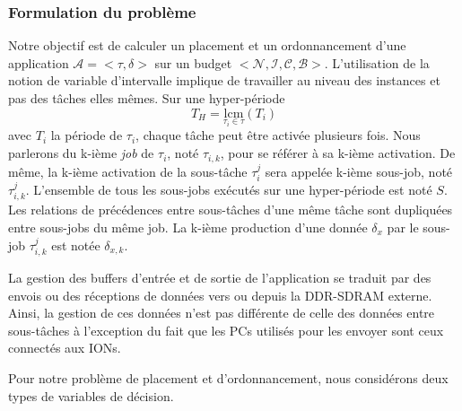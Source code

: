 \documentclass[main.tex]{subfiles}
\begin{document}
\subsubsection{Formulation du problème}
Notre objectif est de calculer un placement et un ordonnancement d'une application $\mathcal{A} = <\tau , \delta>$ sur un budget $<\mathcal{N} , \mathcal{I} , \mathcal{C} , \mathcal{B} >$. L'utilisation de la notion de variable d'intervalle implique de travailler au niveau des instances et pas des tâches elles mêmes. Sur une hyper-période $$T_H = \underset{\tau_i \in \tau}{\text{lcm}} (T_i)$$
avec $T_i$ la période de $\tau_i$, chaque tâche peut être activée plusieurs fois. Nous parlerons du k-ième \emph{job} de $\tau_i$, noté $\tau_{i,k}$, pour se référer à sa k-ième activation. De même, la k-ième activation de la sous-tâche $\tau_i^j$ sera appelée k-ième sous-job, noté $\tau_{i,k}^j$. L'ensemble de tous les sous-jobs exécutés sur une hyper-période est noté $S$. Les relations de précédences entre sous-tâches d'une même tâche sont dupliquées entre sous-jobs du même job. La k-ième production d'une donnée $\delta_x$ par le sous-job $\tau_{i,k}^j$ est notée $\delta_{x,k}$.

La gestion des buffers d'entrée et de sortie de l'application se traduit par des envois ou des réceptions de données vers ou depuis la DDR-SDRAM externe. Ainsi, la gestion de ces données n'est pas différente de celle des données entre sous-tâches à l'exception du fait que les PCs utilisés pour les envoyer sont ceux connectés aux IONs.

Pour notre problème de placement et d'ordonnancement, nous considérons deux types de variables de décision.
\end{document}
